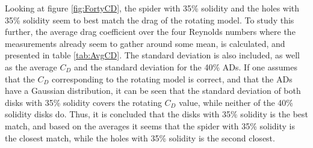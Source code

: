 


Looking at figure \ref{fig:FortyCD}, the \gls{spider} with 35\% solidity and the \gls{holes} with 35\% solidity seem to best match the drag of the rotating model. To study this further, the average drag coefficient over the four Reynolds numbers where the measurements already seem to gather around some mean, is calculated, and presented in table \ref{tab:AvgCD}. The standard deviation is also included, as well as the average $C_D$ and the standard deviation for the 40\% \gls{AD}s. If one assumes that the $C_D$ corresponding to the rotating model is correct, and that the \gls{AD}s have a Gaussian distribution, it can be seen that the standard deviation of both disks with 35\% solidity covers the rotating $C_D$ value, while neither of the 40\% solidity disks do. Thus, it is concluded that the disks with 35\% solidity is the best match, and based on the averages it seems that the \gls{spider} with 35\% solidity is the closest match, while the \gls{holes} with 35\% solidity is the second closest.


